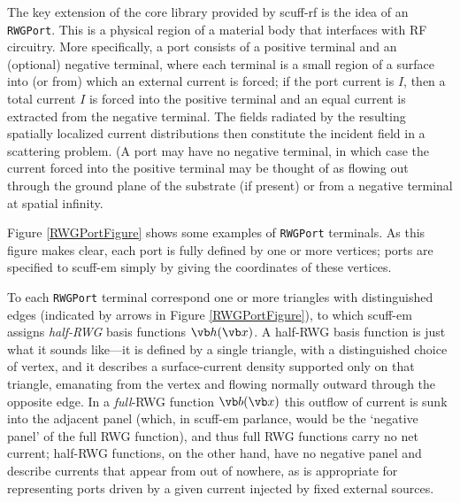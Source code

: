 \documentclass[letterpaper]{article}
\begin{document}
The key extension of the \lss core library provided by {\sc scuff-rf}
is the idea of an \texttt{RWGPort}. This is a physical region of
a material body that interfaces with RF circuitry. More specifically,
a port consists of a positive terminal and an (optional) negative terminal, 
where each terminal is a small region of a surface into (or from)
which an external current is forced; if the port current is $I$, 
then a total current $I$ is forced into the positive terminal
and an equal current is extracted from the negative terminal.
The fields radiated by the resulting
spatially localized current distributions then constitute the incident
field in a scattering problem.
(A port may have no negative terminal, in which case the current
forced into the positive terminal may be thought of as flowing out 
through the ground plane of the substrate (if present) or from 
a negative terminal at spatial infinity.

Figure \ref{RWGPortFigure} shows some examples of \texttt{RWGPort}
terminals. As this figure makes clear, each port is fully defined
by one or more vertices; ports are specified to {\sc scuff-em}
simply by giving the coordinates of these vertices.

To each \texttt{RWGPort} terminal correspond one or more triangles with distinguished
edges (indicated by arrows in Figure \ref{RWGPortFigure}), to which {\sc scuff-em}
assigns \textit{half-RWG} basis functions $\vb h(\vb x)$.
A half-RWG basis function is just what it sounds like---it is defined by
a single triangle, with a distinguished choice of vertex, and it describes
a surface-current density supported only on that triangle,
emanating from the vertex and flowing normally outward through the opposite edge.
In a \textit{full}-RWG function $\vb b(\vb x)$ this outflow of current is
sunk into the adjacent panel (which, in {\sc scuff-em} parlance, would be
the `negative panel' of the full RWG function), and thus full RWG
functions carry no net current; half-RWG functions, on the other hand,
have no negative panel and describe currents that appear from out of nowhere,
as is appropriate for representing ports driven by a given current injected
by fixed external sources.
\end{document}
